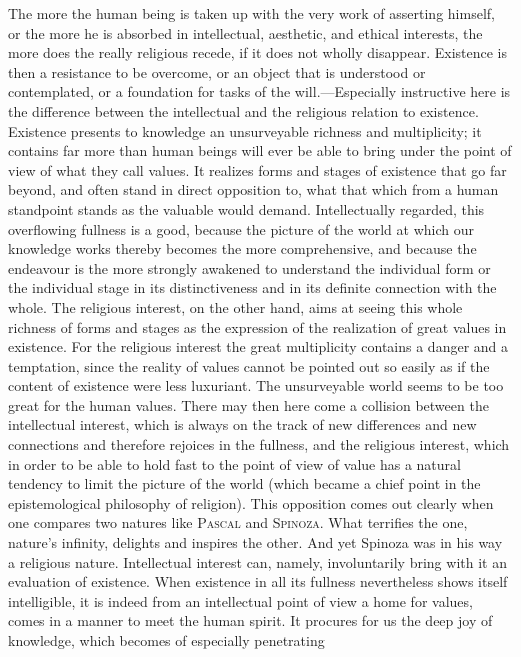 \documentclass[12pt,a4paper]{book}
\newcommand{\opage}[1]{\marginnote{\footnotesize\textit{[#1]}}}
\begin{document}
The more the human being is taken up with the very work of asserting himself,
or the more he is absorbed in intellectual, aesthetic, and ethical interests,
the more does the really religious recede, if it does not wholly disappear.
Existence is then a resistance to be overcome, or an object that is understood
or contemplated, or a foundation for tasks of the will.---Especially
instructive here is the difference between the intellectual and the religious
relation to existence. Existence presents to knowledge an unsurveyable richness
and multiplicity; it contains far more than human beings will ever be able to
bring under the point of view of what they call values. It realizes forms and
stages of existence that go far beyond, and often stand in direct opposition to,
what that which from a human standpoint stands as the valuable would demand.
Intellectually regarded, this overflowing fullness is a good, because the
picture of the world at which our knowledge works thereby becomes the more
comprehensive, and because the endeavour is the more strongly awakened to
understand the individual form or the individual stage in its distinctiveness
and in its definite connection with the whole. The religious interest, on the
other hand, aims at seeing this whole richness of forms and stages as the
expression of the realization of great values in existence. For the religious
interest the great multiplicity contains a danger and a temptation, since the
reality of values cannot be pointed out so easily as if the content of existence
were less luxuriant. The unsurveyable world seems to be too great for the human
values. There may then here come a collision between the intellectual interest,
which is always on the track of new differences and new connections and
therefore rejoices in the fullness, and the religious interest, which in order
to be able to hold fast to the point of view of value has a natural tendency to
limit the picture of the world (which became a chief point in the epistemological
philosophy of religion). This opposition comes out clearly when one compares two
natures like \textsc{Pascal} and \textsc{Spinoza}. What terrifies the one,
nature's infinity, delights and inspires the other. And yet Spinoza was in his
way a religious nature. Intellectual interest can, namely, 
\opage{67}involuntarily bring
with it an evaluation of existence. When existence in all its fullness
nevertheless shows itself intelligible, it is indeed from an intellectual point
of view a home for values, comes in a manner to meet the human spirit. It
procures for us the deep joy of knowledge, which becomes of especially penetrating
\end{document}
